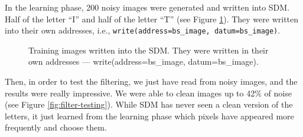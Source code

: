 In the learning phase, 200 noisy images were generated and written into SDM. Half of the letter ``I'' and half of the letter ``T'' (see Figure \ref{fig:filter-training}). They were written into their own addresses, i.e., \lstinline{write(address=bs_image, datum=bs_image)}.

\begin{figure}[!htb]


  \caption{Training images written into the SDM. They were written in their own addresses --- write(address=bs\_image, datum=bs\_image).}
  \label{fig:filter-training}
\end{figure}

Then, in order to test the filtering, we just have read from noisy images, and the results were really impressive. We were able to clean images up to 42\% of noise (see Figure \ref{fig:filter-testing}). While SDM has never seen a clean version of the letters, it just learned from the learning phase which pixels have appeared more frequently and choose them.

